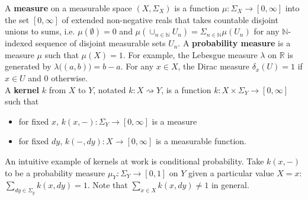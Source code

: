 \documentclass[11pt]{article}
\theoremstyle{definition}
\theoremstyle{plain}
\renewcommand{\b}[1]{\mathbb{#1}}
\begin{document}
\noindent A \textbf{measure} on a measurable space $(X,\Sigma_X)$ is a function
$\mu: \Sigma_X \rightarrow [0,\infty]$ into the set $[0,\infty]$ of extended
non-negative reals that takes countable disjoint unions to sums, i.e. $\mu(\emptyset)=0$
and $\mu(\cup_{n \in \b{N}} U_n) = \Sigma_{n \in \b{N}} \mu(U_n)$ 
for any $\b{N}$-indexed sequence of disjoint measurable sets $U_n$.
A \textbf{probability measure} is a measure $\mu$ such that $\mu(X)=1$.
For example, the Lebesgue measure $\lambda$ on $\b{R}$ is generated by
$\lambda \Big( (a,b) \Big) = b-a$. For any $x \in X$, the Dirac measure 
$\delta_x(U) = 1$ if $x \in U$ and $0$ otherwise.\\

\noindent A \textbf{kernel} $k$ from $X$ to $Y$, notated
$k: X \rightsquigarrow Y$, is a function $k: X \times \Sigma_Y \rightarrow [0,\infty]$
such that

\begin{itemize}
    \item for fixed $x$, $k(x,-): \Sigma_Y \rightarrow [0,\infty]$ is a measure
    \item for fixed $dy$, $k(-,dy): X \rightarrow [0,\infty]$ is a measurable function.
\end{itemize}

\noindent An intuitive example of kernels at work is conditional probability.
Take $k(x,-)$ to be a probability measure $\mu_Y: \Sigma_Y \rightarrow [0,1]$ on $Y$ given a particular value $X=x$:
$\sum_{dy \in \Sigma_y} k(x,dy) = 1$. Note that $\sum_{x \in X} k(x,dy) \neq 1$ in general.\\




\end{document}
